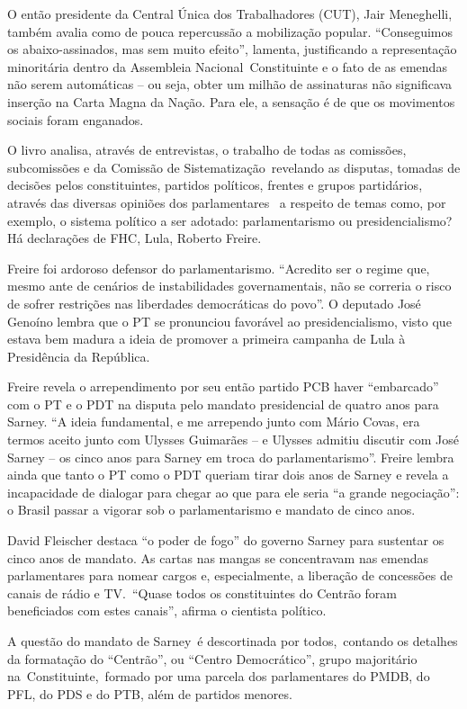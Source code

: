 O então presidente da Central Única dos Trabalhadores (CUT), Jair
Meneghelli, também avalia como de pouca repercussão a mobilização
popular. ``Conseguimos os abaixo-assinados, mas sem muito efeito'',
lamenta, justificando a representação minoritária dentro da Assembleia
Nacional~Constituinte e o fato de as emendas não serem automáticas -- ou
seja, obter um milhão de assinaturas não significava inserção na Carta
Magna da Nação. Para ele, a sensação é de que os movimentos sociais
foram enganados.

O livro analisa, através de entrevistas, o trabalho de todas as
comissões, subcomissões e da Comissão de Sistematização~revelando as
disputas, tomadas de decisões pelos constituintes, partidos políticos,
frentes e grupos partidários, através das diversas opiniões dos
parlamentares~ a respeito de temas como, por exemplo, o sistema político
a ser adotado: parlamentarismo ou presidencialismo? Há declarações de
FHC, Lula, Roberto Freire.

Freire foi ardoroso defensor do parlamentarismo. ``Acredito ser o regime
que, mesmo ante de cenários de instabilidades governamentais, não se
correria o risco de sofrer restrições nas liberdades democráticas do
povo''. O deputado José Genoíno lembra que o PT se pronunciou favorável
ao presidencialismo, visto que estava bem madura a ideia de promover a
primeira campanha de Lula à Presidência da República.

Freire revela o arrependimento por seu então partido PCB haver
``embarcado'' com o PT e o PDT na disputa pelo mandato presidencial de
quatro anos para Sarney. ``A ideia fundamental, e me arrependo junto com
Mário Covas, era termos aceito junto com Ulysses Guimarães -- e Ulysses
admitiu discutir com José Sarney -- os cinco anos para Sarney em troca
do parlamentarismo''. Freire lembra ainda que tanto o PT como o PDT
queriam tirar dois anos de Sarney e revela a incapacidade de dialogar
para chegar ao que para ele seria ``a grande negociação'': o Brasil
passar a vigorar sob o parlamentarismo e mandato de cinco anos.

David Fleischer destaca ``o poder de fogo'' do governo Sarney para
sustentar os cinco anos de mandato. As cartas nas mangas se concentravam
nas emendas parlamentares para nomear cargos e, especialmente, a
liberação de concessões de canais de rádio e TV.~``Quase todos os
constituintes do Centrão foram beneficiados com estes canais'', afirma o
cientista político.

A questão do mandato de Sarney~é descortinada por todos,~contando os
detalhes da formatação do ``Centrão'', ou ``Centro Democrático'', grupo
majoritário na~Constituinte,~formado por uma parcela dos parlamentares
do PMDB, do PFL, do PDS e do PTB, além de partidos menores.

